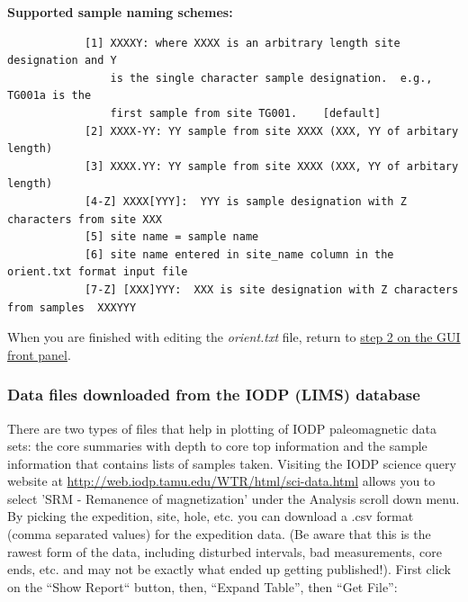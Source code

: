 \documentclass[11pt]{book}
\begin{document}
{{ 

{\bf Supported sample naming schemes:}

\begin{verbatim}
            [1] XXXXY: where XXXX is an arbitrary length site designation and Y
                is the single character sample designation.  e.g., TG001a is the
                first sample from site TG001.    [default]
            [2] XXXX-YY: YY sample from site XXXX (XXX, YY of arbitary length)
            [3] XXXX.YY: YY sample from site XXXX (XXX, YY of arbitary length)
            [4-Z] XXXX[YYY]:  YYY is sample designation with Z characters from site XXX
            [5] site name = sample name
            [6] site name entered in site_name column in the orient.txt format input file
            [7-Z] [XXX]YYY:  XXX is site designation with Z characters from samples  XXXYYY
\end{verbatim}

When you are finished with editing the {\it orient.txt} file,  return to  \href{#orient}{step 2 on the GUI front panel}.


%
%
%
%


\subsubsection{Data files downloaded from the IODP (LIMS) database}


There are two types of files that help in plotting of IODP paleomagnetic data sets: the core summaries with depth to core top information and the sample information that contains lists of samples taken.
Visiting the IODP science query website at \url{http://web.iodp.tamu.edu/WTR/html/sci-data.html} allows you to
select 'SRM - Remanence of magnetization' under the Analysis scroll down menu.  By picking the expedition, site, hole, etc. you can download a  .csv format (comma separated values) for the expedition data.  (Be aware that this is the rawest form of the data, including disturbed intervals, bad measurements, core ends, etc. and may not be exactly what ended up getting published!).   First click on the ``Show Report`` button, then, ``Expand Table'', then ``Get File'':

}}
\end{document}
